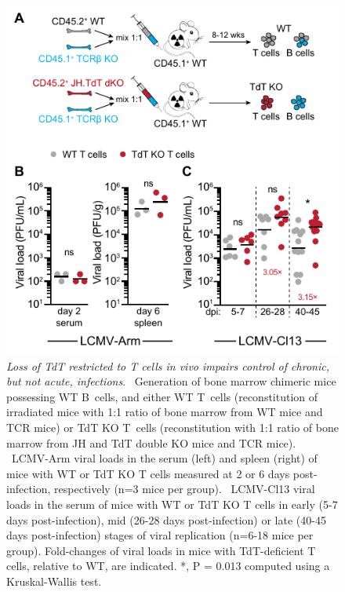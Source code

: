 \begin{figure}[t]
    \centering
    \includegraphics{Figures/AvC/fig5_tdtKO.pdf}
    \caption[Loss of TdT restricted to T cells in vivo impairs control of chronic, but not acute, infections]{\textit{Loss of TdT restricted to T cells in vivo impairs control of chronic, but not acute, infections}. %
    ~Generation of bone marrow chimeric mice possessing WT B~cells, and either WT T~cells (reconstitution of irradiated mice with 1:1 ratio of bone marrow from WT mice and TCR\textbeta{}\KO{} mice) or TdT KO T~cells (reconstitution with 1:1 ratio of bone marrow from JH and TdT double KO mice and TCR\textbeta{}\KO{} mice). %
    ~LCMV-Arm viral loads in the serum (left) and spleen (right) of mice with WT or TdT KO T cells measured at 2 or 6 days post-infection, respectively (n=3 mice per group). %
    ~LCMV-Cl13 viral loads in the serum of mice with WT or TdT KO T cells in early (5-7 days post-infection), mid (26-28 days post-infection) or late (40-45 days post-infection) stages of viral replication (n=6-18 mice per group). Fold-changes of viral loads in mice with TdT-deficient T cells, relative to WT, are indicated. *, P = 0.013 computed using a Kruskal-Wallis test.}
    \label{fig:AvC_tdtKO}
\end{figure}
